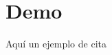 \documentclass[twoside,11pt]{PlantillaTFG}
\begin{document}
	\maketitle

	\frontmatter
	
		
	
	
	
	
	\tableofcontents
	
	\mainmatter

	\pagestyle{fancy}
	\chapter{Demo}
	Aquí un ejemplo de cita \cite{miprimerabiblio}
	\lipsum[1-10]
	
	
	
	
\end{document}

